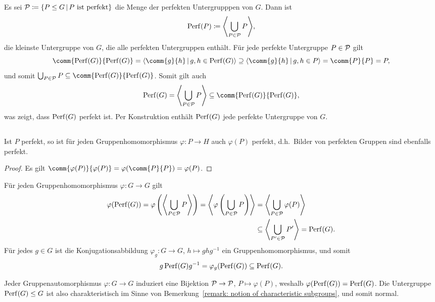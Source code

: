 Es sei $\perfects \coloneqq \{P \subgroup G \suchthat \text{$P$ ist perfekt}\}$ die Menge der perfekten Untergrupppen von $G$.
Dann ist
\[
            \Perf{P}
  \coloneqq \generated*{ \bigcup_{P \in \perfects} P },
\]
die kleinste Untergruppe von $G$, die alle perfekten Untergruppen enthält.
Für jede perfekte Untergruppe $P \in \perfects$ gilt
\[
            \comm{\Perf{G}}{\Perf{G}}
  =         \generated{ \comm{g}{h} \suchthat g, h \in \Perf{G} }
  \supseteq \generated{ \comm{g}{h} \suchthat g, h \in P }
  =         \comm{P}{P}
  =         P,
\]
und somit $\bigcup_{P \in \perfects} P \subseteq \comm{\Perf{G}}{\Perf{G}}$.
Somit gilt auch
\[
            \Perf{G}
  =         \generated*{ \bigcup_{P \in \perfects} P }
  \subseteq \comm{\Perf{G}}{\Perf{G}},
\]
was zeigt, dass $\Perf{G}$ perfekt ist.
Per Konstruktion enthält $\Perf{G}$ jede perfekte Untergruppe von $G$.





\subsection{}

\begin{lemma}
  Ist $P$ perfekt, so ist für jeden Gruppenhomomorphismus $\varphi \colon P \to H$ auch $\varphi(P)$ perfekt, d.h.\ Bilder von perfekten Gruppen sind ebenfalls perfekt.
\end{lemma}

\begin{proof}
  Es gilt $\comm{ \varphi(P) }{ \varphi(P) } = \varphi( \comm{P}{P} ) = \varphi(P)$.
\end{proof}

Für jeden Gruppenhomomorphismus $\varphi \colon G \to G$ gilt
\begin{align*}
              \varphi( \Perf{G} )
   =          \varphi\left( \generated*{ \bigcup_{P \in \perfects} P } \right)
   =          \generated*{ \varphi\left( \bigcup_{P \in \perfects} P \right) }
  &=          \generated*{ \bigcup_{P \in \perfects} \varphi(P) }
  \\
  &\subseteq  \generated*{ \bigcup_{P' \in \perfects} P' }
   =          \Perf{G}.
\end{align*}
Für jedes $g \in G$ ist die Konjugationsabbildung $\varphi_g \colon G \to G$, $h \mapsto ghg^{-1}$ ein Gruppenhomomorphismus, und somit
\[
            g \Perf{G} g^{-1}
  =         \varphi_g( \Perf{G} )
  \subseteq \Perf{G}.
\]

\begin{remark}
  Jeder Gruppenautomorphismus $\varphi \colon G \to G$ induziert eine Bijektion $\perfects \to \perfects$, $P \mapsto \varphi(P)$, weshalb $\varphi(\Perf{G}) = \Perf{G}$.
  Die Untergruppe $\Perf{G} \subgroup G$ ist also charakteristisch im Sinne von Bemerkung~\ref{remark: notion of characteristic subgroups}, und somit normal.
\end{remark}





